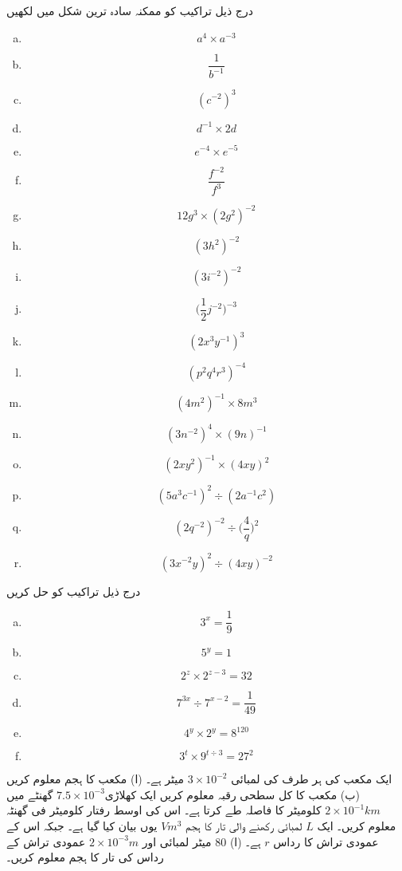 درج ذیل تراکیب کو ممکنہ سادہ ترین شکل میں لکھیں
\begin{multicols}{3}
\begin{enumerate}[a.]
\item
\[a^{4}\times a^{-3}\]
\item
\[\frac{1}{b^{-1}}\]
\item
\[(c^{-2})^{3}\]
\item
\[d^{-1}\times 2d\]
\item
\[e^{-4}\times e^{-5}\]
\item
\[\frac{f^{-2}}{f^{3}}\]
\item
\[12g^{3}\times(2g^{2})^{-2}\]
\item
\[(3h^{2})^{-2}\]
\item
\[(3i^{-2})^{-2}\]
\item
\[\big(\frac{1}{2}j^{-2}\big)^{-3}\]
\item
\[(2x^{3}y^{-1})^{3}\]
\item
\[(p^{2}q^{4}r^{3})^{-4}\]
\item
\[(4m^{2})^{-1}\times 8m^{3}\]
\item
\[(3n^{-2})^{4}\times (9n)^{-1}\]
\item
\[(2xy^{2})^{-1}\times (4xy)^{2}\]
\item
\[(5a^{3}c^{-1})^{2}\div (2a^{-1}c^{2})\]
\item
\[(2q^{-2})^{-2}\div \big(\frac{4}{q}\big)^{2}\]
\item
\[(3x^{-2}y)^{2}\div(4xy)^{-2}\]
\end{enumerate}
\end{multicols}
درج ذیل تراکیب کو حل کریں
\begin{multicols}{3}
\begin{enumerate}[a.]
\item
\[3^{x}=\frac{1}{9}\]
\item
\[5^{y}=1\]
\item
\[2^{z}\times 2^{z-3}=32\]
\item
\[7^{3x}\div 7^{x-2}=\frac{1}{49}\]
\item
\[4^{y}\times 2^{y}=8^{120}\]
\item
\[3^{t}\times 9^{t\div 3}=27^{2}\]
\end{enumerate}
\end{multicols}
ایک مکعب کی ہر طرف کی لمبائی \(3\times 10^{-2}\) میٹر ہے۔
(ا) مکعب کا ہجم معلوم کریں
(ب) مکعب کا کل سطحی رقبہ معلوم کریں
ایک کھلاڑی\(7.5\times 10 ^{-3}\) گھنٹے میں  \(2\times 10^{-1}km\) کلومیٹر کا فاصلہ طے کرتا ہے۔ اس کی اوسط رفتار کلومیٹر فی گھنٹہ معلوم کریں۔
ایک 
\(L\)
لمبائی رکھنے والی تار کا ہجم
 \(Vm^{3}\)
 یوں بیان کیا گیا ہے۔ جبکہ اس کے عمودی تراش کا رداس
 \(r\)
  ہے۔
(ا) 
\(80\)
میٹر لمبائی اور \(2\times 10^{-3}m\) عمودی تراش کے رداس کی تار کا ہجم معلوم کریں۔

